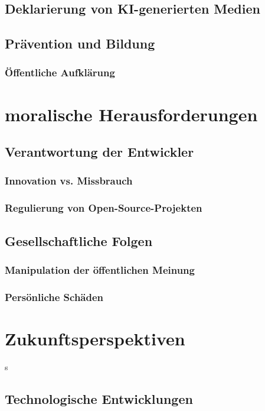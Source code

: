\documentclass[a4paper,12pt]{article}
\begin{document}
\subsection{Deklarierung von KI-generierten Medien}


\subsection{Prävention und Bildung}
\subsubsection{Öffentliche Aufklärung}
\newpage

\section{moralische Herausforderungen}
\subsection{Verantwortung der Entwickler}
\subsubsection{Innovation vs. Missbrauch}
\subsubsection{Regulierung von Open-Source-Projekten}
\subsection{Gesellschaftliche Folgen}
\subsubsection{Manipulation der öffentlichen Meinung}
\subsubsection{Persönliche Schäden}
\newpage

\section{Zukunftsperspektiven}s
\subsection{Technologische Entwicklungen}
\end{document}
